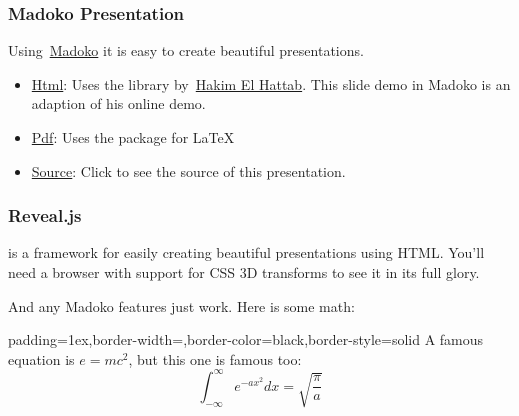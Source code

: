\documentclass[xcolor=table]{beamer}
\begin{document}
\begin{mdframe}%

\frametitle{Madoko Presentation}\label{heading-sec-madoko-presentation}%

\noindent{}Using~\href{http://madoko.codeplex.com}{Madoko} it is easy to create beautiful presentations.%

\begin{itemize}[noitemsep,topsep=\mdcompacttopsep]%

\item{}\href{http://research.microsoft.com/en-us/um/people/daan/madoko/samples/slidedemo/out/slidedemo.html}{Html}:
Uses the  library by~\href{http://hakim.se}{Hakim El Hattab}.\mdbr
{}This slide demo in Madoko is an adaption of his online demo.%

\item{}\href{http://research.microsoft.com/en-us/um/people/daan/madoko/samples/slidedemo/out/slidedemo.pdf}{Pdf}:
Uses the  package for LaTeX%

\item{}\href{https://www.madoko.net/editor.html?\%23url=http://research.microsoft.com/en-us/um/people/daan/madoko/samples/slidedemo/slidedemo.mdk\%26options=\%7B"delayedUpdate":"true"\%7D}{Source}:
Click to see the source of this presentation.%
\end{itemize}%
\end{mdframe}\label{sec-madoko-presentation}%

\begin{mdframe}%

\frametitle{Reveal.js}\label{heading-sec-revealjs}%

\noindent{} is a framework for easily creating beautiful presentations using
HTML. You'll need a browser with support for CSS 3D transforms to see it in
its full glory.%

And any Madoko features just work. Here is some math:%

\begin{mdbmargintb}{1ex}{}%
\begin{mdblock}{padding=1ex,border-width=,border-color=black,border-style=solid}%
\noindent{}A famous equation is $e = mc^2$, but this one is 
famous too:%
\label{eq-gaussian}%
\noindent{}
\noindent\[%
\int_{-\infty}^\infty e^{-a x^2} d x = \sqrt{\frac{\pi}{a}} 
\]%
\end{mdblock}%
\end{mdbmargintb}%
\end{mdframe}\label{sec-revealjs}%
\end{document}
